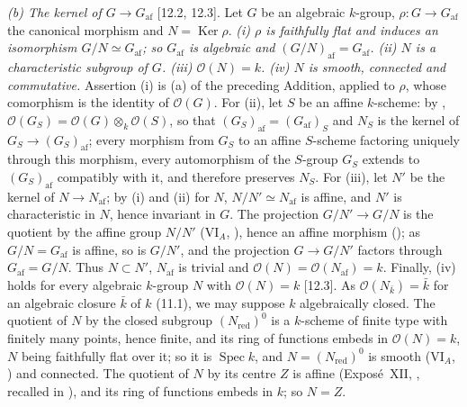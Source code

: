 \par\smallskip\noindent\textit{(b) The kernel of \(G\to G_{\mathrm{af}}\)} [12.2, 12.3]. Let
\(G\) be an algebraic \(k\)-group, \(\rho:G\to G_{\mathrm{af}}\) the canonical morphism and
\(N=\operatorname{Ker}\rho\). \emph{\textup{(i)} \(\rho\) is faithfully flat and induces an
isomorphism \(G/N\simeq G_{\mathrm{af}}\); so \(G_{\mathrm{af}}\) is algebraic and
\((G/N)_{\mathrm{af}}=G_{\mathrm{af}}\). \textup{(ii)} \(N\) is a characteristic subgroup of
\(G\). \textup{(iii)} \(\mathcal O(N)=k\). \textup{(iv)} \(N\) is smooth, connected and
commutative.} Assertion (i) is (a) of the preceding Addition, applied to \(\rho\), whose
comorphism is the identity of \(\mathcal O(G)\). For (ii), let \(S\) be an affine
\(k\)-scheme: by ,
\(\mathcal O(G_S)=\mathcal O(G)\otimes_k\mathcal O(S)\), so that
\((G_S)_{\mathrm{af}}=(G_{\mathrm{af}})_S\) and \(N_S\) is the kernel of
\(G_S\to(G_S)_{\mathrm{af}}\); every morphism from \(G_S\) to an affine \(S\)-scheme factoring
uniquely through this morphism, every automorphism of the \(S\)-group \(G_S\) extends to
\((G_S)_{\mathrm{af}}\) compatibly with it, and therefore preserves \(N_S\). For (iii), let
\(N'\) be the kernel of \(N\to N_{\mathrm{af}}\); by (i) and (ii) for \(N\),
\(N/N'\simeq N_{\mathrm{af}}\) is affine, and \(N'\) is characteristic in \(N\), hence
invariant in \(G\). The projection \(G/N'\to G/N\) is the quotient by the affine group
\(N/N'\) (VI\(_A\), ), hence an affine morphism
(); as \(G/N=G_{\mathrm{af}}\) is affine, so is
\(G/N'\), and the projection \(G\to G/N'\) factors through \(G_{\mathrm{af}}=G/N\). Thus
\(N\subset N'\), \(N_{\mathrm{af}}\) is trivial and
\(\mathcal O(N)=\mathcal O(N_{\mathrm{af}})=k\). Finally, (iv) holds for every algebraic
\(k\)-group \(N\) with \(\mathcal O(N)=k\) [12.3]. As \(\mathcal O(N_{\bar k})=\bar k\) for an
algebraic closure \(\bar k\) of \(k\) (11.1), we may suppose \(k\) algebraically closed. The
quotient of \(N\) by the closed subgroup \((N_{\mathrm{red}})^0\) is a \(k\)-scheme of finite
type with finitely many points, hence finite, and its ring of functions embeds in
\(\mathcal O(N)=k\), \(N\) being faithfully flat over it; so it is \(\operatorname{Spec}k\), and
\(N=(N_{\mathrm{red}})^0\) is smooth (VI\(_A\), ) and
connected. The quotient of \(N\) by its centre \(Z\) is affine (Expos\'e~XII,
, recalled in ), and its ring of functions embeds in \(k\); so \(N=Z\).

